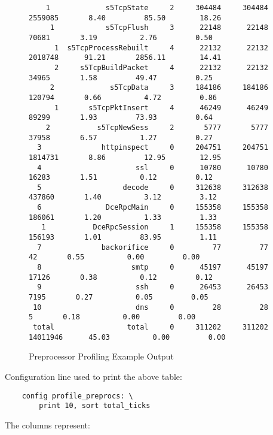 \documentclass[english]{report}
\begin{document}
\begin{figure}
{\begin{verbatim}
    1             s5TcpState     2     304484     304484             2559085       8.40         85.50        18.26
     1            s5TcpFlush     3      22148      22148               70681       3.19          2.76         0.50
      1  s5TcpProcessRebuilt     4      22132      22132             2018748      91.21       2856.11        14.41
      2     s5TcpBuildPacket     4      22132      22132               34965       1.58         49.47         0.25
     2             s5TcpData     3     184186     184186              120794       0.66          4.72         0.86
      1       s5TcpPktInsert     4      46249      46249               89299       1.93         73.93         0.64
    2           s5TcpNewSess     2       5777       5777               37958       6.57          1.27         0.27
  3              httpinspect     0     204751     204751             1814731       8.86         12.95        12.95
  4                      ssl     0      10780      10780               16283       1.51          0.12         0.12
  5                   decode     0     312638     312638              437860       1.40          3.12         3.12
  6               DceRpcMain     0     155358     155358              186061       1.20          1.33         1.33
   1           DceRpcSession     1     155358     155358              156193       1.01         83.95         1.11
  7              backorifice     0         77         77                  42       0.55          0.00         0.00
  8                     smtp     0      45197      45197               17126       0.38          0.12         0.12
  9                      ssh     0      26453      26453                7195       0.27          0.05         0.05
 10                      dns     0         28         28                   5       0.18          0.00         0.00
 total                 total     0     311202     311202            14011946      45.03          0.00         0.00
\end{verbatim}
}
\caption{Preprocessor Profiling Example Output}
\label{preprocessor profiling example output}
\end{figure}

Configuration line used to print the above table: 

\begin{verbatim}
    config profile_preprocs: \
        print 10, sort total_ticks
\end{verbatim}

The columns represent:
\end{document}

